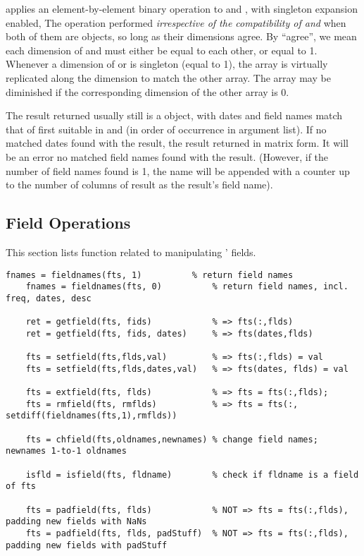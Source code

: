     applies an element-by-element binary operation to  and , 
   with singleton expansion enabled, 
   The operation performed \emph{irrespective of the compatibility of  and }
   when both of them are \myfints{} objects, so long as their dimensions agree.
   By ``agree'', we mean each dimension of  and  must either be equal to each other, 
   or equal to 1. 
   Whenever a dimension of  or  is singleton (equal to 1),
   the array is virtually replicated along the dimension to match the other array. 
   The array may be diminished if the corresponding dimension of the other array is 0.
   
   The result returned usually still is a \myfints{} object,
   with dates and field names match that of first suitable in  and  (in order of occurrence in argument list).
   If no matched dates found with the result, the result returned in matrix form.
   It will be an error no matched field names found with the result.
   (However, if the number of field names found is 1, the name will be appended with a counter
   up to the number of columns of result as the result's field name).


\subsection{Field Operations}
This section lists function related to manipulating \myfints{}' fields.

\begin{lstlisting}[numbers=none]
    fnames = fieldnames(fts, 1)          % return field names
    fnames = fieldnames(fts, 0)          % return field names, incl. freq, dates, desc

    ret = getfield(fts, fids)            % => fts(:,flds)
    ret = getfield(fts, fids, dates)     % => fts(dates,flds)

    fts = setfield(fts,flds,val)         % => fts(:,flds) = val
    fts = setfield(fts,flds,dates,val)   % => fts(dates, flds) = val

    fts = extfield(fts, flds)            % => fts = fts(:,flds);
    fts = rmfield(fts, rmflds)           % => fts = fts(:, setdiff(fieldnames(fts,1),rmflds))

    fts = chfield(fts,oldnames,newnames) % change field names; newnames 1-to-1 oldnames

    isfld = isfield(fts, fldname)        % check if fldname is a field of fts

    fts = padfield(fts, flds)            % NOT => fts = fts(:,flds), padding new fields with NaNs
    fts = padfield(fts, flds, padStuff)  % NOT => fts = fts(:,flds), padding new fields with padStuff
\end{lstlisting}

